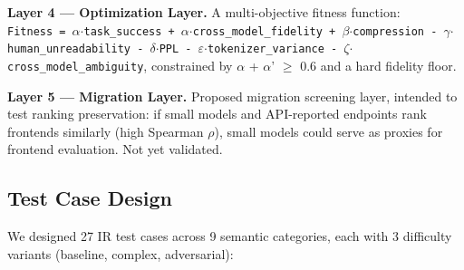\documentclass{article}
\begin{document}
\textbf{Layer 4 --- Optimization Layer.} A multi-objective fitness function: \texttt{Fitness\ =\ $\alpha$$\cdot$task\_success\ +\ $\alpha$\textquotesingle{}$\cdot$cross\_model\_fidelity\ +\ $\beta$$\cdot$compression\ -\ $\gamma$$\cdot$human\_unreadability\ -\ $\delta$$\cdot$PPL\ -\ $\varepsilon$$\cdot$tokenizer\_variance\ -\ $\zeta$$\cdot$cross\_model\_ambiguity}, constrained by $\alpha$ + $\alpha$' $\geq$ 0.6 and a hard fidelity floor.



\textbf{Layer 5 --- Migration Layer.} Proposed migration screening layer, intended to test ranking preservation: if small models and API-reported endpoints rank frontends similarly (high Spearman $\rho$), small models could serve as proxies for frontend evaluation. Not yet validated.



\subsection{Test Case Design}\label{test-case-design}



We designed 27 IR test cases across 9 semantic categories, each with 3 difficulty variants (baseline, complex, adversarial):
\end{document}
